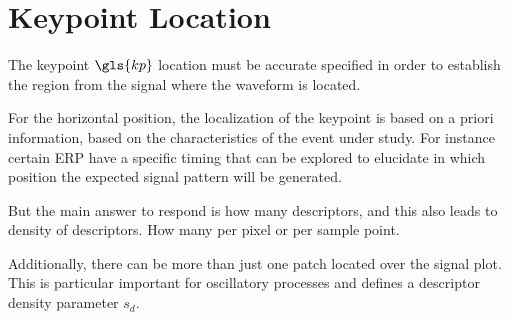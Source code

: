 

\section{Keypoint Location}

%



The keypoint $\gls{kp}$ location must be accurate specified in order to establish the region from the signal where the waveform is located.

For the horizontal position, the localization of the keypoint is based on a priori information, based on the characteristics of the event under study.  For instance certain ERP have a specific timing that can be explored to elucidate in which position the expected signal pattern will be generated.

But the main answer to respond is how many descriptors, and this also leads to density of descriptors.  How many per pixel or per sample point.

Additionally, there can be more than just one patch located over the signal plot.  This is particular important for oscillatory processes and defines a descriptor density parameter $s_d$.

